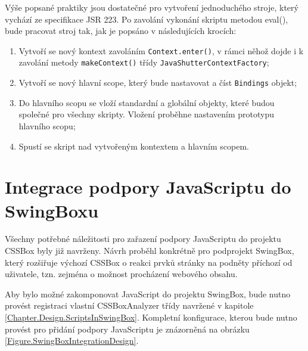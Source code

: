 Výše popsané praktiky jsou dostatečné pro vytvoření jednoduchého stroje, který vychází ze specifikace JSR 223.  Po zavolání vykonání skriptu metodou eval(), bude pracovat stroj tak, jak je popsáno v následujících krocích:  

\begin{enumerate}
  \item	Vytvoří se nový kontext zavoláním \texttt{Context.enter()}, v rámci něhož dojde i k zavolání metody \texttt{makeContext()} třídy \texttt{JavaShutterContextFactory};
  \item	Vytvoří se nový hlavní scope, který bude nastavovat a číst \texttt{Bindings} objekt;
  \item	Do hlavního scopu se vloží standardní a globální objekty, které budou společné pro všechny skripty. Vložení proběhne nastavením prototypu hlavního scopu;
  \item	Spustí se skript nad vytvořeným kontextem a hlavním scopem.
\end{enumerate}

\section{Integrace podpory JavaScriptu do SwingBoxu}
\label{Chapter.Design.SwingBoxIntegration}

Všechny potřebné náležitosti pro zařazení podpory JavaScriptu do projektu CSSBox byly již navrženy. Návrh proběhl konkrétně pro podprojekt SwingBox, který rozšiřuje výchozí  CSSBox o reakci prvků stránky na podněty příchozí od uživatele, tzn. zejména o možnost procházení webového obsahu. 

Aby bylo možné zakomponovat JavaScript do projektu SwingBox, bude nutno provést registraci vlastní CSSBoxAnalyzer třídy navržené v kapitole \ref{Chapter.Design.ScriptsInSwingBox}. Kompletní konfigurace, kterou bude nutno provést pro přidání podpory JavaScriptu je znázorněná na obrázku \ref{Figure.SwingBoxIntegrationDesign}.

